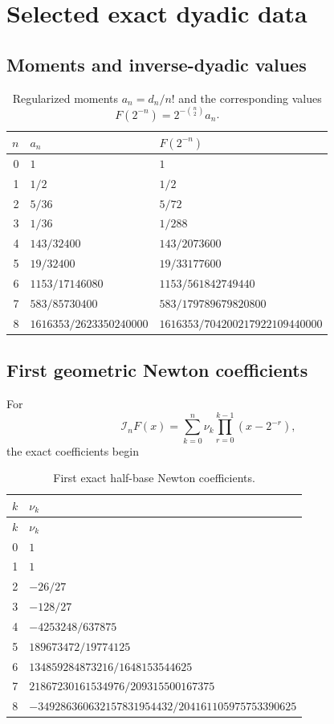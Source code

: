 \documentclass[11pt,oneside]{book}
\numberwithin{equation}{chapter}
\theoremstyle{definition}
\theoremstyle{remark}
\newcommand{\Interp}{\mathcal I}
\begin{document}
\chapter{Selected exact dyadic data}
\label{app:exact-data}

\section{Moments and inverse-dyadic values}

\begin{table}[htbp]
\centering
\caption{Regularized moments $a_n=d_n/n!$ and the corresponding values
$F(2^{-n})=2^{-\binom n2}a_n$.}
\label{tab:exact-fabius-data}
\small
\begin{tabular}{@{}rll@{}}
\toprule
$n$ & $a_n$ & $F(2^{-n})$\\
\midrule
0 & $1$ & $1$\\
1 & $1/2$ & $1/2$\\
2 & $5/36$ & $5/72$\\
3 & $1/36$ & $1/288$\\
4 & $143/32400$ & $143/2073600$\\
5 & $19/32400$ & $19/33177600$\\
6 & $1153/17146080$ & $1153/561842749440$\\
7 & $583/85730400$ & $583/179789679820800$\\
8 & $1616353/2623350240000$
  & $1616353/704200217922109440000$\\
\bottomrule
\end{tabular}
\end{table}

\section{First geometric Newton coefficients}

For
\[
 \Interp_nF(x)=\sum_{k=0}^n\nu_k
 \prod_{r=0}^{k-1}(x-2^{-r}),
\]
the exact coefficients begin
\begin{longtable}{@{}rl@{}}
\caption{First exact half-base Newton coefficients.}
\label{tab:exact-newton-coefficients}\\
\toprule
$k$ & $\nu_k$\\
\midrule
\endfirsthead
\toprule
$k$ & $\nu_k$\\
\midrule
\endhead
0 & $1$\\
1 & $1$\\
2 & $-26/27$\\
3 & $-128/27$\\
4 & $-4253248/637875$\\
5 & $189673472/19774125$\\
6 & $134859284873216/1648153544625$\\
7 & $21867230161534976/209315500167375$\\
8 & $-349286360632157831954432/204161105975753390625$\\
\bottomrule
\end{longtable}
\end{document}
